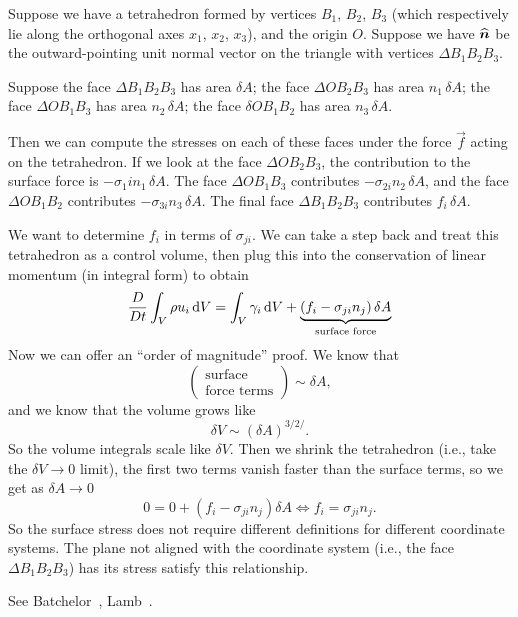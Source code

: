 \begin{node}
Suppose we have a tetrahedron formed by vertices $B_{1}$, $B_{2}$,
$B_{3}$ (which respectively lie along the orthogonal axes $x_{1}$, $x_{2}$, $x_{3}$),
and the origin $O$. Suppose we have $\widehat{\boldsymbol{n}}$ be the
outward-pointing unit normal vector on the triangle with vertices
$\Delta B_{1}B_{2}B_{3}$.

Suppose the face $\Delta B_{1}B_{2}B_{3}$ has area $\delta A$;
the face $\Delta OB_{2}B_{3}$ has area $n_{1}\,\delta A$;
the face $\Delta OB_{1}B_{3}$ has area $n_{2}\,\delta A$;
the face $\delta OB_{1}B_{2}$ has area $n_{3}\,\delta A$.

Then we can compute the stresses on each of these faces under the
force $\vec{f}$ acting on the tetrahedron. If we look at the face
$\Delta OB_{2}B_{3}$, the contribution to the surface force is
$-\sigma_{1}in_{1}\,\delta A$. The face $\Delta OB_{1}B_{3}$
contributes $-\sigma_{2i}n_{2}\,\delta A$, and the face $\Delta OB_{1}B_{2}$
contributes $-\sigma_{3i}n_{3}\,\delta A$. The final face $\Delta B_{1}B_{2}B_{3}$
contributes $f_{i}\,\delta A$.

We want to determine $f_{i}$ in terms of $\sigma_{ji}$. We can take a
step back and treat this tetrahedron as a control volume, then plug
this into the conservation of linear momentum (in integral form) to
obtain
\begin{equation}
\frac{D}{D t}\int_{V}\rho u_{i}\,\mathrm{d} V = \int_{V}\gamma_{i}\,\mathrm{d} V +
\underbrace{(f_{i}-\sigma_{ji}n_{j})\,\delta A}_{\text{surface force}}
\end{equation}
Now we can offer an ``order of magnitude'' proof. We know that
\begin{equation}
  \begin{pmatrix}\mbox{surface}\\
    \mbox{force terms}
  \end{pmatrix}\sim\delta A,
\end{equation}
and we know that the volume grows like
\begin{equation}
\delta V\sim(\delta A)^{3/2/}.
\end{equation}
So the volume integrals scale like $\delta V$. Then we shrink the
tetrahedron (i.e., take the $\delta V\to0$ limit), the first two terms
vanish faster than the surface terms, so we get as $\delta A\to 0$
\begin{equation}
0 = 0 + (f_{i}-\sigma_{ji}n_{j})\delta A\iff f_{i}=\sigma_{ji}n_{j}.
\end{equation}
So the surface stress does not require different definitions for
different coordinate systems. The plane not aligned with the
coordinate system (i.e., the face $\Delta B_{1}B_{2}B_{3}$) has its
stress satisfy this relationship.

See Batchelor~\cite[p.~9]{batchelor1973introduction}, Lamb~\cite[\S2]{lamb1930hydrodynamics}.
\end{node}

